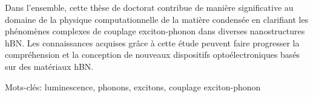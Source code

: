 Dans l'ensemble, cette thèse de doctorat contribue de manière significative au domaine de la physique computationnelle de la matière condensée en clarifiant les phénomènes complexes de couplage exciton-phonon dans diverses nanostructures hBN. Les connaissances acquises grâce à cette étude peuvent faire progresser la compréhension et la conception de nouveaux dispositifs optoélectroniques basés sur des matériaux hBN.

\vspace{0.5cm}
Mots-clés: luminescence, phonons, excitons, couplage exciton-phonon